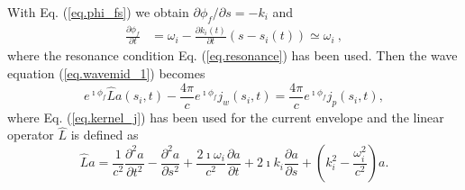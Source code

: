 With Eq. (\ref{eq.phi_fs}) we obtain $\partial \phi_f/\partial s =- k_i$
and
\begin{equation} \label{eq.phif}
    \begin{aligned}
    \frac{\partial \phi_f}{\partial t} & = %
     \omega_i - \frac{\partial k_i(t)}{\partial t}(s-s_i(t))
    \simeq \omega_i~,
    \end{aligned}
\end{equation}
where the resonance condition Eq. (\ref{eq.resonance}) has been used. 
Then the wave equation (\ref{eq.wavemid_1}) becomes 
\begin{equation}\label{eq.wave}
 e^{\imath \phi_f} \hat{L} a(s_i,t)-\frac{4 \pi}{c}e^{\imath \phi_f}j_w(s_i,t)=\frac{4 \pi}{c} e^{\imath \phi_f}j_p(s_i,t),
\end{equation}
where  Eq. (\ref{eq.kernel_j}) has been used for the current envelope
and                
the linear operator $\hat{L} $ is defined as  
\begin{equation}
    \hat{L} a=  \frac{1}{c^2}\frac{\partial^2 a}{\partial t^2} - \frac{\partial^2 a}{\partial s^2} + \frac{2 \imath \omega_i}{c^2} \frac{\partial a}{\partial t}+ 2 \imath k_i \frac{\partial a}{\partial s} + (k_i^2 - \frac{\omega_i^2}{c^2})a.
\end{equation}


